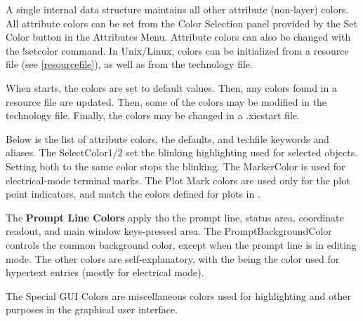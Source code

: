 A single internal data structure maintains all other attribute
(non-layer) colors.  All attribute colors can be set from the {\cb
Color Selection} panel provided by the {\cb Set Color} button in the
{\cb Attributes Menu}.  Attribute colors can also be changed with the
{\cb !setcolor} command.  In Unix/Linux, colors can be initialized
from a resource file (see \ref{resourcefile}), as well as from the
technology file.

When {\Xic} starts, the colors are set to default values.  Then, any
colors found in a resource file are updated.  Then, some of the colors
may be modified in the technology file.  Finally, the colors may be
changed in a {\vt .xicstart} file.

Below is the list of attribute colors, the defaults, and techfile
keywords and aliases.  The {\vt SelectColor}1/2 set the blinking
highlighting used for selected objects.  Setting both to the same
color stops the blinking.  The {\vt MarkerColor} is used for
electrical-mode terminal marks.  The {\cb Plot Mark} colors are used
only for the plot point indicators, and match the colors defined for
plots in {\WRspice}.

The {\bf Prompt Line Colors} apply tho the prompt line, status area,
coordinate readout, and main window keys-pressed area.  The {\vt
PromptBackgroundColor} controls the common background color, except
when the prompt line is in editing mode.  The other colors are
self-explanatory, with the  being the
color used for hypertext entries (mostly for electrical mode).

The {\cb Special GUI Colors} are miscellaneous colors used for
highlighting and other purposes in the graphical user interface.


